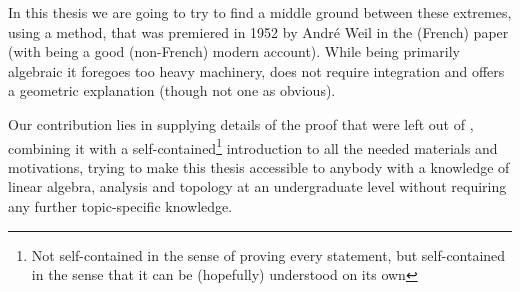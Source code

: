 In this thesis we are going to try to find a middle ground between these extremes, using a method, that was premiered in 1952
by André Weil in the (French) paper \cite{weil_sur_1952}
(with \cite{bott_differential_1982} being a good (non-French) modern account). While being primarily algebraic it foregoes too
heavy machinery, does not require integration and offers a geometric explanation (though not one as obvious).

Our contribution lies in supplying details of the proof that were left out of \cite{bott_differential_1982}, combining
it with a self-contained\footnote{
	Not self-contained in the sense of proving every statement, but self-contained in the sense that it can be
	(hopefully) understood on its own
}
introduction to all the needed materials and motivations, trying to make this thesis accessible to anybody with a
knowledge of linear algebra, analysis and topology at an undergraduate level without requiring any further topic-specific
knowledge.
 

